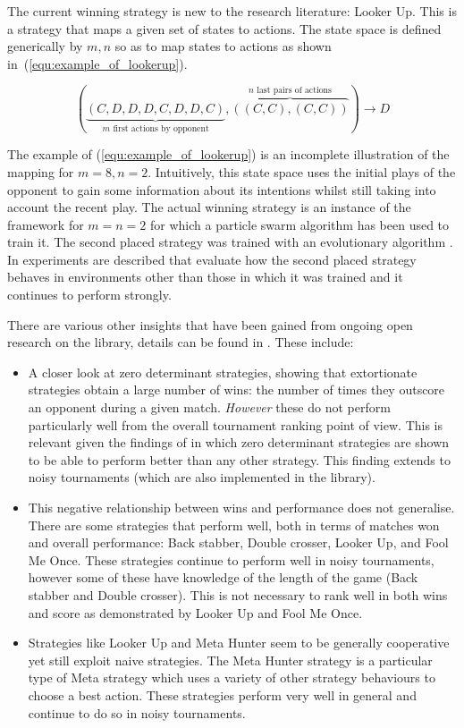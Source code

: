 \documentclass{jors}
\begin{document}
The current winning strategy is new to the research literature: Looker Up. This
is a strategy that maps a given set of states to actions. The state space is
defined generically by \(m, n\) so as to map states to actions as shown
in~(\ref{equ:example_of_lookerup}).

\begin{equation}
    (\underbrace{(C, D, D, D, C, D, D, C)}_{m\text{ first actions by opponent}},
    \overbrace{((C, C), (C, C))}^{n\text{ last pairs of actions}}) \to D
    \label{equ:example_of_lookerup}
\end{equation}

The example of (\ref{equ:example_of_lookerup}) is an incomplete illustration of
the mapping for \(m=8, n=2\). Intuitively, this state space uses the initial
plays of the opponent to gain some information about its intentions whilst still
taking into account the recent play. The actual winning strategy is an instance
of the framework for \(m=n=2\) for which a particle swarm algorithm has been
used to train it. The second placed strategy was trained with an evolutionary
algorithm \cite{Jones2015, George2016}.
In \cite{Knight2015} experiments are described that evaluate how the second
placed strategy behaves in environments other than those in which it was trained
and it continues to perform strongly.

There are various other insights that have been gained from ongoing open
research on the library, details can be found in \cite{Harper2015}. These include:

\begin{itemize}[noitemsep,topsep=0pt]
    \item A closer look at zero determinant strategies, showing that
		extortionate strategies obtain a large number of wins: the number of
		times they outscore an opponent during a given match. \textit{However} these do
		not perform particularly well from the overall tournament ranking point of
		view. This is relevant given the findings of \cite{Stewart2012} in which zero
		determinant strategies are shown to be able to perform better than any other
		strategy. This finding extends to noisy tournaments (which are also implemented
		in the library).
    \item This negative relationship between wins and performance does not
        generalise. There are some strategies that perform well, both in terms
        of matches won and overall performance: Back stabber, Double crosser,
        Looker Up, and Fool Me Once. These strategies continue to perform well in noisy
        tournaments, however some of these have knowledge of the length of the
        game (Back stabber and Double crosser). This is not necessary to rank
        well in both wins and score as demonstrated by Looker Up and Fool Me
        Once.
    \item Strategies like Looker Up and Meta Hunter seem to be generally
        cooperative yet still exploit naive strategies. The Meta Hunter strategy
        is a particular type of Meta strategy which uses a variety of other
        strategy behaviours to choose a best action. These strategies perform
        very well in general and continue to do so in noisy tournaments.
\end{itemize}
\end{document}
